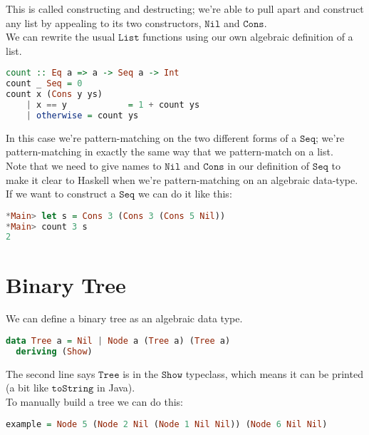 \documentclass[a4paper,12pt]{article}
\newcommand{\kwa}[1]{\mathtt{#1}}
\begin{document}
\noindent
This is called constructing and destructing; we're able to pull apart and construct any list by appealing to its two constructors, $\kwa{Nil}$ and $\kwa{Cons}$.\\

\noindent
We can rewrite the usual $\kwa{List}$ functions using our own algebraic definition of a list.

\begin{lstlisting}[language=Haskell]
count :: Eq a => a -> Seq a -> Int
count _ Seq = 0
count x (Cons y ys)
	| x == y			= 1 + count ys
	| otherwise	= count ys 
\end{lstlisting}

\noindent
In this case we're pattern-matching on the two different forms of a $\kwa{Seq}$; we're pattern-matching in exactly the same way that we pattern-match on a list. \\

\noindent
Note that we need to give names to $\kwa{Nil}$ and $\kwa{Cons}$ in our definition of $\kwa{Seq}$ to make it clear to Haskell when we're pattern-matching on an algebraic data-type. \\

\noindent
If we want to construct a $\kwa{Seq}$ we can do it like this: 

\begin{lstlisting}[language=Haskell]
*Main> let s = Cons 3 (Cons 3 (Cons 5 Nil))
*Main> count 3 s
2
\end{lstlisting}

\section{Binary Tree}

We can define a binary tree as an algebraic data type.


\begin{lstlisting}[language=Haskell]
data Tree a = Nil | Node a (Tree a) (Tree a)
  deriving (Show)
\end{lstlisting}

\noindent
The second line says $\kwa{Tree}$ is in the $\kwa{Show}$ typeclass, which means it can be printed (a bit like $\kwa{toString}$ in Java). \\

\noindent
To manually build a tree we can do this:

\begin{lstlisting}[language=Haskell]
example = Node 5 (Node 2 Nil (Node 1 Nil Nil)) (Node 6 Nil Nil)
\end{lstlisting}
\end{document}
